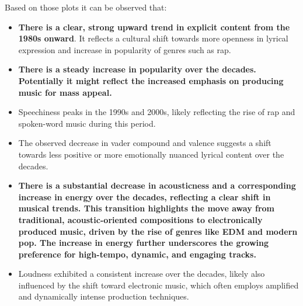 Based on those plots it can be observed that:
\begin{itemize}
  \item \textbf{There is a clear, strong upward trend in explicit content from
    the 1980s onward}. It reflects a cultural shift  towards more openness in
    lyrical expression and increase in popularity of genres such as rap.
  \item \textbf{There is a steady increase in popularity over the decades. Potentially
    it might reflect the increased emphasis on producing music for mass appeal.}
  \item Speechiness peaks in the 1990s and 2000s, likely reflecting the rise of
    rap and spoken-word music during this period.
  \item The observed decrease in vader compound and valence suggests a shift
    towards less positive or more emotionally nuanced lyrical content over the
    decades.
  \item \textbf{There is a substantial decrease in acousticness and a
      corresponding increase in energy over the decades, reflecting a clear
      shift in musical trends. This transition highlights the move away from
      traditional, acoustic-oriented compositions to electronically produced
      music, driven by the rise of genres like EDM and modern pop. The increase
    in energy further underscores the growing preference for high-tempo,
  dynamic, and engaging tracks.}
  \item Loudness exhibited a consistent increase over the decades, likely
    also influenced by the shift toward electronic music, which often employs
    amplified and dynamically intense production techniques.
\end{itemize}

